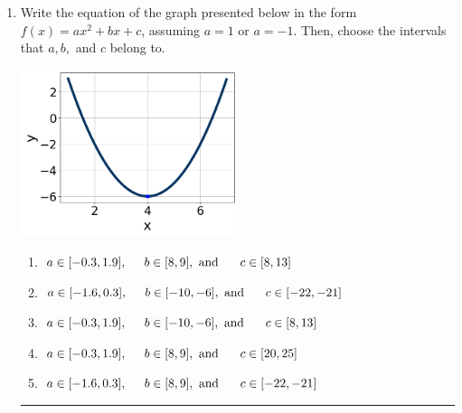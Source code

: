 \documentclass[14pt]{extbook}
\newcommand{\litem}[1]{\item#1\hspace*{-1cm}\rule{\textwidth}{0.4pt}}
\begin{document}
\begin{enumerate}
{\begin{enumerate}[label=\Alph*.]
\end{enumerate} }
\litem{
Write the equation of the graph presented below in the form $f(x)=ax^2+bx+c$, assuming  $a=1$ or $a=-1$. Then, choose the intervals that $a, b,$ and $c$ belong to.
\begin{center}
    \includegraphics[width=0.5\textwidth]{../Figures/quadraticGraphToEquationA.png}
\end{center}
\begin{enumerate}[label=\Alph*.]
\item \( a \in [-0.3, 1.9], \hspace*{5mm} b \in [8, 9], \text{ and } \hspace*{5mm} c \in [8, 13] \)
\item \( a \in [-1.6, 0.3], \hspace*{5mm} b \in [-10, -6], \text{ and } \hspace*{5mm} c \in [-22, -21] \)
\item \( a \in [-0.3, 1.9], \hspace*{5mm} b \in [-10, -6], \text{ and } \hspace*{5mm} c \in [8, 13] \)
\item \( a \in [-0.3, 1.9], \hspace*{5mm} b \in [8, 9], \text{ and } \hspace*{5mm} c \in [20, 25] \)
\item \( a \in [-1.6, 0.3], \hspace*{5mm} b \in [8, 9], \text{ and } \hspace*{5mm} c \in [-22, -21] \)


\end{enumerate}}
\end{enumerate}
\end{document}
